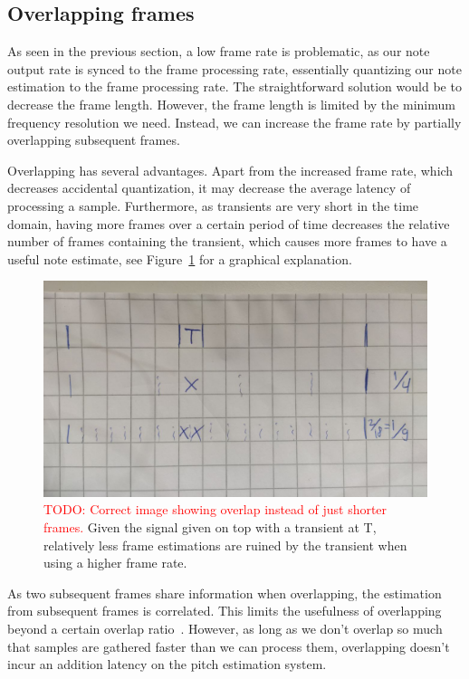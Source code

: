\documentclass[10pt,twocolumn]{article}
\begin{document}
\subsection{Overlapping frames}
As seen in the previous section, a low frame rate is problematic, as our note output rate is synced to the frame processing rate, essentially quantizing our note estimation to the frame processing rate. The straightforward solution would be to decrease the frame length. However, the frame length is limited by the minimum frequency resolution we need. Instead, we can increase the frame rate by partially overlapping subsequent frames.

Overlapping has several advantages. Apart from the increased frame rate, which decreases accidental quantization, it may decrease the average latency of processing a sample. Furthermore, as transients are very short in the time domain, having more frames over a certain period of time decreases the relative number of frames containing the transient, which causes more frames to have a useful note estimate, see Figure~\ref{fig:overlap_transient} for a graphical explanation.
\begin{figure}[h]
    \centering
    \includegraphics[width=\linewidth]{fig/overlap_transient.jpg}
    \caption{\textcolor{red}{TODO: Correct image showing overlap instead of just shorter frames.} Given the signal given on top with a transient at T, relatively less frame estimations are ruined by the transient when using a higher frame rate.}
    \label{fig:overlap_transient}
\end{figure}

As two subsequent frames share information when overlapping, the estimation from subsequent frames is correlated. This limits the usefulness of overlapping beyond a certain overlap ratio~\cite{overlap}. However, as long as we don't overlap so much that samples are gathered faster than we can process them, overlapping doesn't incur an addition latency on the pitch estimation system.
\end{document}
